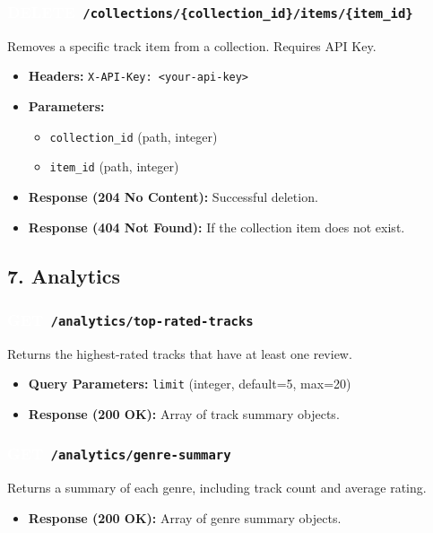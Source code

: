 \documentclass[11pt,a4paper]{article}
\newcommand{\methodGET}{\colorbox{getcolor}{\textcolor{white}{\textbf{GET}}}}
\newcommand{\methodDELETE}{\colorbox{deletecolor}{\textcolor{white}{\textbf{DELETE}}}}
\begin{document}
\subsubsection*{\methodDELETE \texttt{ /collections/\{collection\_id\}/items/\{item\_id\}}}
Removes a specific track item from a collection. Requires API Key.
\begin{itemize}[label=\textcolor{primary}{\textbullet}, noitemsep]
    \item \textbf{Headers:} \texttt{X-API-Key: <your-api-key>}
    \item \textbf{Parameters:} 
    \begin{itemize}[label=--, noitemsep]
        \item \texttt{collection\_id} (path, integer)
        \item \texttt{item\_id} (path, integer)
    \end{itemize}
    \item \textbf{Response (204 No Content):} Successful deletion.
    \item \textbf{Response (404 Not Found):} If the collection item does not exist.
\end{itemize}

\subsection{7. Analytics}

\subsubsection*{\methodGET \texttt{ /analytics/top-rated-tracks}}
Returns the highest-rated tracks that have at least one review.
\begin{itemize}[label=\textcolor{primary}{\textbullet}, noitemsep]
    \item \textbf{Query Parameters:} \texttt{limit} (integer, default=5, max=20)
    \item \textbf{Response (200 OK):} Array of track summary objects.
\end{itemize}

\subsubsection*{\methodGET \texttt{ /analytics/genre-summary}}
Returns a summary of each genre, including track count and average rating.
\begin{itemize}[label=\textcolor{primary}{\textbullet}, noitemsep]
    \item \textbf{Response (200 OK):} Array of genre summary objects.
\end{itemize}
\end{document}
